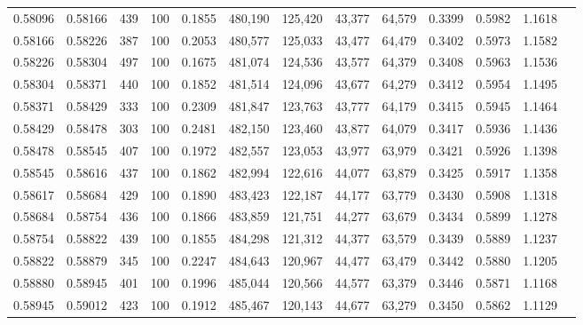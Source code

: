 \begin{tabular}{rrrrrrrrrrrrr}
0.58096 & 0.58166 &   439 & 100 &                                     0.1855 & 480,190 & 125,420 &  43,377 &  64,579 & 0.3399 & 0.5982 & 1.1618 \\
0.58166 & 0.58226 &   387 & 100 &                                     0.2053 & 480,577 & 125,033 &  43,477 &  64,479 & 0.3402 & 0.5973 & 1.1582 \\
0.58226 & 0.58304 &   497 & 100 &                                     0.1675 & 481,074 & 124,536 &  43,577 &  64,379 & 0.3408 & 0.5963 & 1.1536 \\
0.58304 & 0.58371 &   440 & 100 &                                     0.1852 & 481,514 & 124,096 &  43,677 &  64,279 & 0.3412 & 0.5954 & 1.1495 \\
0.58371 & 0.58429 &   333 & 100 &                                     0.2309 & 481,847 & 123,763 &  43,777 &  64,179 & 0.3415 & 0.5945 & 1.1464 \\
0.58429 & 0.58478 &   303 & 100 &                                     0.2481 & 482,150 & 123,460 &  43,877 &  64,079 & 0.3417 & 0.5936 & 1.1436 \\
0.58478 & 0.58545 &   407 & 100 &                                     0.1972 & 482,557 & 123,053 &  43,977 &  63,979 & 0.3421 & 0.5926 & 1.1398 \\
0.58545 & 0.58616 &   437 & 100 &                                     0.1862 & 482,994 & 122,616 &  44,077 &  63,879 & 0.3425 & 0.5917 & 1.1358 \\
0.58617 & 0.58684 &   429 & 100 &                                     0.1890 & 483,423 & 122,187 &  44,177 &  63,779 & 0.3430 & 0.5908 & 1.1318 \\
0.58684 & 0.58754 &   436 & 100 &                                     0.1866 & 483,859 & 121,751 &  44,277 &  63,679 & 0.3434 & 0.5899 & 1.1278 \\
0.58754 & 0.58822 &   439 & 100 &                                     0.1855 & 484,298 & 121,312 &  44,377 &  63,579 & 0.3439 & 0.5889 & 1.1237 \\
0.58822 & 0.58879 &   345 & 100 &                                     0.2247 & 484,643 & 120,967 &  44,477 &  63,479 & 0.3442 & 0.5880 & 1.1205 \\
0.58880 & 0.58945 &   401 & 100 &                                     0.1996 & 485,044 & 120,566 &  44,577 &  63,379 & 0.3446 & 0.5871 & 1.1168 \\
0.58945 & 0.59012 &   423 & 100 &                                     0.1912 & 485,467 & 120,143 &  44,677 &  63,279 & 0.3450 & 0.5862 & 1.1129 \\

\end{tabular}
